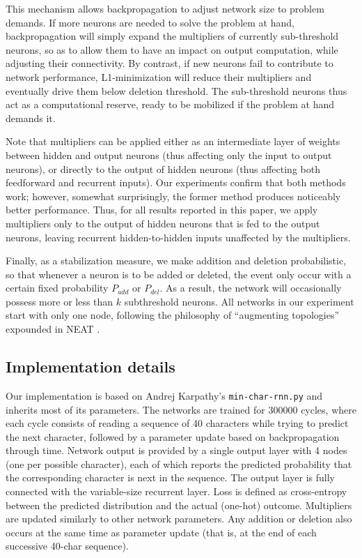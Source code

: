 \documentclass{article}
\begin{document}
This mechanism allows backpropagation to adjust network size to problem
demands. If more neurons are needed to solve the problem at hand,
backpropagation will simply expand the multipliers of currently sub-threshold
neurons, so as to allow them to have an impact on output computation, while adjusting their connectivity. By
contrast, if new neurons fail to contribute to network performance,
L1-minimization  will reduce their multipliers and eventually drive them below
deletion threshold. The sub-threshold neurons thus act as a computational
reserve, ready to be mobilized if the problem at hand demands it.

Note that multipliers can be  applied either as an intermediate layer of
weights between hidden and output neurons (thus affecting only the input to
output neurons), or directly to the output of hidden neurons (thus affecting
both feedforward and recurrent inputs). Our experiments confirm that both methods work; however, somewhat surprisingly, the 
former method produces noticeably better performance. 
Thus, for all results reported in this paper, we apply multipliers only to the output of hidden neurons that is fed to the output neurons,
leaving recurrent hidden-to-hidden inputs unaffected by the multipliers. 


Finally, as a stabilization measure, we make
addition and deletion probabilistic, so that whenever a neuron is to be added
or deleted, the event only occur with a certain fixed probability $P_{add}$ or
$P_{del}$. As a result, the network will occasionally possess more or less than
$k$ subthreshold neurons. All networks in our experiment start with only one
node, following the philosophy of ``augmenting topologies'' expounded in NEAT
\cite{Stanley2002-ug}.

\subsection{Implementation details}

Our implementation is based on Andrej Karpathy's \verb+min-char-rnn.py+ and
inherits most of its parameters.  The networks are trained for 300000 cycles,
where each cycle consists of reading a sequence of 40 characters while trying
to predict the next character, followed by a parameter update based on
backpropagation through time. Network output is provided by a single output
layer with 4 nodes (one per possible character), each of which reports the
predicted probability that the corresponding character is next in the sequence. The output layer is fully connected with the variable-size recurrent layer.
Loss is defined as cross-entropy between the predicted distribution and the
actual (one-hot) outcome. Multipliers are updated similarly to other network
parameters. Any addition or deletion also occurs at the same time as parameter
update (that is, at the end of each successive 40-char sequence). 
\end{document}
